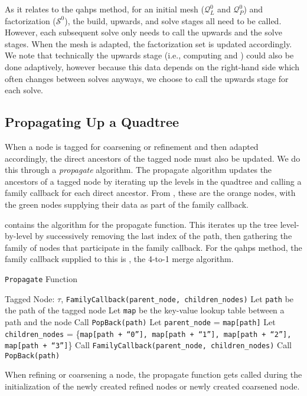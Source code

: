 As it relates to the \gls{qahps} method, for an initial mesh ($\mathcal{Q}^{0}_{L}$ and $\mathcal{Q}^{0}_{P}$) and factorization ($\mathcal{S}^{0}$), the build, upwards, and solve stages all need to be called. However, each subsequent solve only needs to call the upwards and the solve stages. When the mesh is adapted, the factorization set is updated accordingly. We note that technically the upwards stage (i.e., computing \htau and \wtau) could also be done adaptively, however because this data depends on the right-hand side which often changes between solves anyways, we choose to call the upwards stage for each solve.

\subsection{Propagating Up a Quadtree}

When a node is tagged for coarsening or refinement and then adapted accordingly, the direct ancestors of the tagged node must also be updated. We do this through a {\em propagate} algorithm. The propagate algorithm updates the ancestors of a tagged node by iterating up the levels in the quadtree and calling a family callback for each direct ancestor. From , these are the orange nodes, with the green nodes supplying their data as part of the family callback.

 contains the algorithm for the propagate function. This iterates up the tree level-by-level by successively removing the last index of the path, then gathering the family of nodes that participate in the family callback. For the \gls{qahps} method, the family callback supplied to this is , the 4-to-1 merge algorithm.

\begin{algorithm}
    \caption{\texttt{Propagate} Function}
    \begin{algorithmic}[0]
        \Require Tagged Node: $\tau$, \texttt{FamilyCallback(parent\_node, children\_nodes)}
        \State Let \texttt{path} be the path of the tagged node
        \State Let \texttt{map} be the key-value lookup table between a path and the node
        \State Call \texttt{PopBack(path)} 
            \State Let \texttt{parent\_node} = \texttt{map[path]}
            \State Let \texttt{children\_nodes} = \{\texttt{map[path + ``0''], map[path + ``1''], map[path + ``2''], map[path + ``3'']}\}
            \State Call \texttt{FamilyCallback(parent\_node, children\_nodes)}
            \State Call \texttt{PopBack(path)}
        \EndWhile
    \end{algorithmic}
    \label{alg:propagate}
\end{algorithm}

When refining or coarsening a node, the propagate function gets called during the initialization of the newly created refined nodes or newly created coarsened node.

